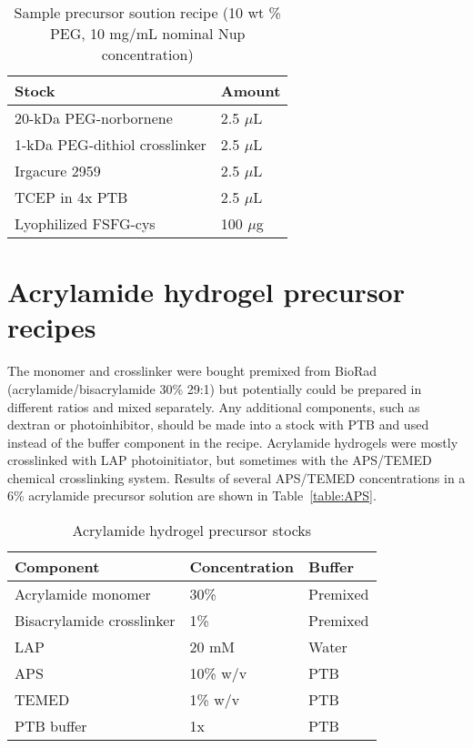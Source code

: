 \begin{table}[b!]
\centering
  \caption[PEG hydrogel recipes.]{Sample precursor soution recipe (10 wt \% PEG, 10 mg/mL nominal Nup concentration)}
    \label{table:Irgacure-recipe}
    \begin{tabular}{p{5cm}p{5cm}}
      Stock & Amount \\
\hline
20-kDa PEG-norbornene & 2.5 $\mu$L \\

1-kDa PEG-dithiol crosslinker & 2.5 $\mu$L \\

Irgacure 2959 & 2.5 $\mu$L \\

TCEP in 4x PTB & 2.5 $\mu$L \\

Lyophilized FSFG-cys & 100 $\mu$g \\
\hline
    \end{tabular}
\end{table}

\section{Acrylamide hydrogel precursor recipes}
The monomer and crosslinker were bought premixed from BioRad (acrylamide/bisacrylamide 30\% 29:1) but potentially could be prepared in different ratios and mixed separately.  Any additional components, such as dextran or photoinhibitor, should be made into a stock with PTB and used instead of the buffer component in the recipe.  Acrylamide hydrogels were mostly crosslinked with LAP photoinitiator, but sometimes with the APS/TEMED chemical crosslinking system.  Results of several APS/TEMED concentrations in a 6\% acrylamide precursor solution are shown in Table~\ref{table:APS}.

\begin{table}[b!]
\centering
  \caption[Acrylamide hydrogel precursor stocks.] {Acrylamide hydrogel precursor stocks}
    \label{table:acrylamide}
    \begin{tabular}{p{5cm}p{4cm}p{5cm}}
      Component & Concentration & Buffer \\
\hline
Acrylamide monomer & 30\% & Premixed \\
Bisacrylamide crosslinker & 1\% & Premixed \\
LAP & 20 mM & Water \\
APS & 10\% w/v & PTB \\
TEMED & 1\% w/v & PTB \\
PTB buffer & 1x & PTB \\
\hline
    \end{tabular}
\end{table}

